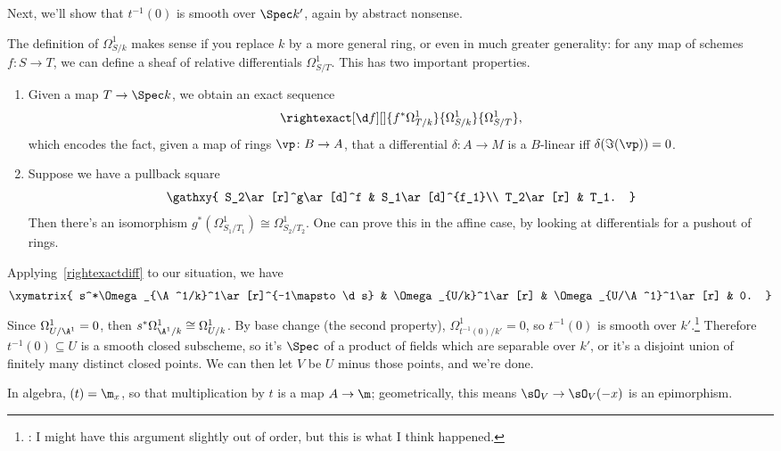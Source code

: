 Next, we'll show that $t^{-1}(0)$ is smooth over $\Spec k'$, again by abstract nonsense.
\begin{rem}
The definition of $\Omega_{S/k}^1$ makes sense if you replace $k$ by a more general ring, or even in much greater
generality: for any map of schemes $f\colon S\to T$, we can define a sheaf of relative differentials
$\Omega_{S/T}^1$. This has two important properties.
\begin{enumerate}
	\item Given a map $T\to\Spec k$, we obtain an exact sequence
	\begin{equation}
	\label{rightexactdiff}
		\rightexact[\d f][]{f^*\Omega_{T/k}^1}{\Omega^1_{S/k}}{\Omega_{S/T}^1},
	\end{equation}
	which encodes the fact, given a map of rings $\vp\colon B\to A$, that a differential $\delta\colon A\to M$ is a
	$B$-linear iff $\delta(\Im(\vp)) = 0$.
	\item Suppose we have a pullback square
	\begin{equation}
		\gathxy{
			S_2\ar[r]^g\ar[d]^f & S_1\ar[d]^{f_1}\\
			T_2\ar[r] & T_1.
		}
	\end{equation}
	Then there's an isomorphism $g^*(\Omega^1_{S_1/T_1})\cong\Omega^1_{S_2/T_2}$. One can prove this in the affine
	case, by looking at differentials for a pushout of rings.
	\qedhere
\end{enumerate}
\end{rem}
Applying~\eqref{rightexactdiff} to our situation, we have
\begin{equation}
\xymatrix{
	s^*\Omega_{\A^1/k}^1\ar[r]^{-1\mapsto\d s} & \Omega_{U/k}^1\ar[r] & \Omega_{U/\A^1}^1\ar[r] & 0.
}
\end{equation}
Since $\Omega_{U/\A^1}^1 = 0$, then $s^*\Omega_{\A^1/k}^1\cong\Omega_{U/k}^1$. By base change (the second
property), $\Omega_{t^{-1}(0)/k'}^1 = 0$, so $t^{-1}(0)$ is smooth over $k'$.\footnote{\TODO: I might have this
argument slightly out of order, but this is what I think happened.} Therefore $t^{-1}(0)\subseteq U$ is a smooth
closed subscheme, so it's $\Spec$ of a product of fields which are separable over $k'$, or it's a disjoint union of
finitely many distinct closed points. We can then let $V$ be $U$ minus those points, and we're done.

In algebra, $(t) = \m_x$, so that multiplication by $t$ is a map $A\to\m$; geometrically, this means
$\sO_V\to\sO_V(-x)$ is an epimorphism.


